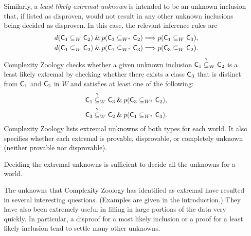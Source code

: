 Similarly, a \textit{least likely extremal unknown} is intended to be an
unknown inclusion that, if listed as disproven, would not result in any other
unknown inclusions being decided as disproven. In this case, the relevant
inference rules are
\begin{align*}
d(\mathsf{C}_1\subseteq_W\mathsf{C}_2)\mathbin{\&} p(\mathsf{C}_3\subseteq_{W^*}\mathsf{C}_2)&\Longrightarrow
p(\mathsf{C}_1\subseteq_W\mathsf{C}_3), \\
d(\mathsf{C}_1\subseteq_W\mathsf{C}_2)\mathbin{\&} p(\mathsf{C}_1\subseteq_{W^*}\mathsf{C}_3)&\Longrightarrow
p(\mathsf{C}_3\subseteq_W\mathsf{C}_2).
\end{align*}
Complexity Zoology checks whether a given unknown inclusion
$\mathsf{C}_1\stackrel{?}{\subseteq}_W\mathsf{C}_2$ is a least likely extremal by checking whether there
exists a class $\mathsf{C}_3$ that is distinct from $\mathsf{C}_1$ and $\mathsf{C}_2$ in $W$ and
satisfies at least one of the following:
\begin{align*}
\mathsf{C}_1\stackrel{?}{\subseteq}_W\mathsf{C}_3\mathbin{\&} p(\mathsf{C}_3\subseteq_{W^*}\mathsf{C}_2), \\
\mathsf{C}_3\stackrel{?}{\subseteq}_W\mathsf{C}_2\mathbin{\&} p(\mathsf{C}_1\subseteq_{W^*}\mathsf{C}_3).
\end{align*}
Complexity Zoology lists extremal unknowns of both types for each world. It
also specifies whether each extremal is provable, disprovable, or completely
unknown (neither provable nor disprovable).
\begin{proposition}
Deciding the extremal unknowns is sufficient to decide all the unknowns for a
world.
\end{proposition}
The unknowns that Complexity Zoology has identified as extremal have resulted
in several interesting questions. (Examples are given in the introduction.) They have
also been extremely useful in
filling in large portions of the data very quickly. In particular, a disproof
for a most likely inclusion or a proof for a least likely inclusion tend to
settle many other unknowns.

